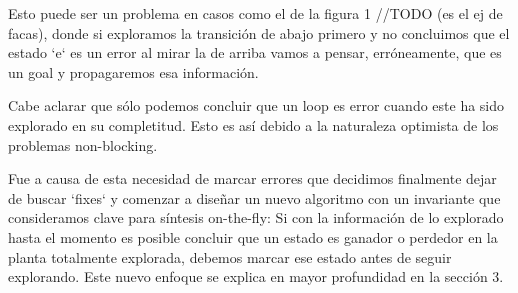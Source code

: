 Esto puede ser un problema en casos como el de la figura 1 //TODO (es el ej de facas), donde si exploramos la transición de abajo primero y no concluimos que el estado `e` es un error al mirar la de arriba vamos a pensar, erróneamente, que es un goal y propagaremos esa información.

Cabe aclarar que sólo podemos concluir que un loop es error cuando este ha sido explorado en su completitud. Esto es así debido a la naturaleza optimista de los problemas non-blocking.

Fue a causa de esta necesidad de marcar errores que decidimos finalmente dejar de buscar `fixes` y comenzar a diseñar un nuevo algoritmo con un invariante que consideramos clave para síntesis on-the-fly: Si con la información de lo explorado hasta el momento es posible concluir que un estado es ganador o perdedor en la planta totalmente explorada, debemos marcar ese estado antes de seguir explorando. Este nuevo enfoque se explica en mayor profundidad en la sección 3.





